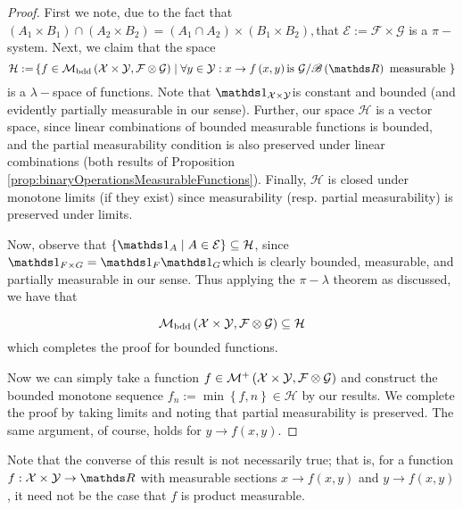\begin{proof}
First we note, due to the fact that $\left(A_{1}\times B_{1}\right)\cap\left(A_{2}\times B_{2}\right)=\left(A_{1}\cap A_{2}\right)\times\left(B_{1}\times B_{2}\right),$that
$\mathcal{\mathcal{E:=}F}\times\mathcal{G}$ is a $\pi-$system. Next,
we claim that the space
\[
\mathcal{H:=}\left\{ f\in\mathcal{M_{\text{bdd}}}\left(\X\times\mathcal{Y},\mathcal{F}\otimes\mathcal{G}\right)\mid\forall y\in\mathcal{Y}:x\to f\left(x,y\right)\text{is }\mathcal{G}/\borel\left(\R\right)\text{ measurable }\right\} 
\]
is a $\lambda-$space of functions. Note that $\indicate_{\X\times\mathcal{Y}}$is
constant and bounded (and evidently partially measurable in our sense).
Further, our space $\mathcal{H}$ is a vector space, since linear
combinations of bounded measurable functions is bounded, and the partial
measurability condition is also preserved under linear combinations
(both results of Proposition \ref{prop:binaryOperationsMeasurableFunctions}).
Finally, $\mathcal{H}$ is closed under monotone limits (if they exist)
since measurability (resp. partial measurability) is preserved under
limits.

Now, observe that $\left\{ \indicate_{A}\mid A\in\mathcal{E}\right\} \subseteq\mathcal{H}$,
since $\indicate_{F\times G}=\indicate_{F}\indicate_{G}$which is
clearly bounded, measurable, and partially measurable in our sense.
Thus applying the $\pi-\lambda$ theorem as discussed, we have that

\[
\mathcal{M_{\text{bdd}}}\left(\mathcal{X}\times\mathcal{Y},\mathcal{F}\otimes\mathcal{G}\right)\subseteq\mathcal{H}
\]
which completes the proof for bounded functions.

Now we can simply take a function $f\in\mathcal{M}^{+}\left(\mathcal{X}\times\mathcal{Y},\mathcal{F}\otimes\mathcal{G}\right)$
and construct the bounded monotone sequence $f_{n}:=\min\left\{ f,n\right\} \in\mathcal{H}$
by our results. We complete the proof by taking limits and noting
that partial measurability is preserved. The same argument, of course,
holds for $y\to f\left(x,y\right)$.
\end{proof}
Note that the converse of this result is not necessarily true; that
is, for a function $f:\X\times\mathcal{Y}\to\R$ with measurable sections
$x\to f\left(x,y\right)$ and $y\to f\left(x,y\right)$, it need not
be the case that $f$ is product measurable.
